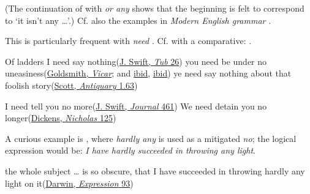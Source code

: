\noindent (The continuation of  with \textit{or any} shows that the beginning is felt to correspond to `it isn't any {\dots}'.) Cf. also the
examples in \textit{Modern English grammar} \citep[\href{https://archive.org/details/jespersen-1954-a-modern-english-grammar-on-historical-principles-part-ii-syntax-first-volume/page/426/mode/2up?view=theater}{16.74}]{jespersenMEG2}. %

This is particularly frequent with \textit{need} . Cf. with a comparative: .

\ea \label{ex:06-08}
\ea Of ladders I need say nothing\hfill(\href{https://en.wikisource.org/wiki/Page:The_Works_of_the_Rev._Jonathan_Swift,_Volume_2.djvu/126}{J. Swift, \textit{Tub} 26})
\ex you need be under no uneasiness\hfill(\href{https://archive.org/details/TheVicarOfWakefield/page/n123/mode/2up?q=%22under+no+uneasiness%22&view=theater}{Goldsmith, \textit{Vicar}}; and \href{https://archive.org/details/TheVicarOfWakefield/page/n145/mode/2up?q=%22under+no+uneasiness%22&view=theater}{ibid}, \href{https://archive.org/details/TheVicarOfWakefield/page/n269/mode/2up?q=%22under+no+uneasiness%22&view=theater}{ibid}) %
\ex ye need say nothing about that foolish story\hfill(\href{https://archive.org/details/cewaverleynovels03scotuoft/page/42/mode/2up?q=%22need+say+nothing%22&view=theater}{Scott, \textit{Antiquary} 1.63})
\z
\z

\ea \label{ex:06-11}
\ea I need tell you no more\hfill(\href{https://archive.org/details/journaltostellae00swifuoft/page/460/mode/2up?q=%22need+tell+you+no+more%22&view=theater}{J. Swift, \textit{Journal} 461})
\ex We need detain you no longer\hfill(\href{https://archive.org/details/lifeadventuresofdickrich/page/138/mode/2up?q=%22detain+you+no+longer%22&view=theater}{Dickens, \textit{Nicholas} 125})
\z
\z

A curious example is , where \textit{hardly any} is used as a mitigated \textit{no}; the logical expression would be: \textit{I have hardly succeeded in throwing any light}.

\ea \label{ex:06-13}
the whole subject {\dots} is so obscure, that I have succeeded in throwing hardly any light on it\hfill(\href{https://archive.org/details/expressionofemot1872darw/page/92/mode/2up?view=theater&q=%22whole+subject%22}{Darwin, \textit{Expression} 93}) %
\z

